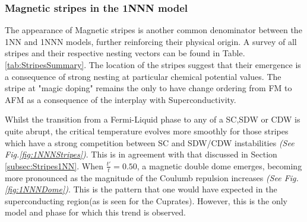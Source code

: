 \documentclass[12pt]{article}
\begin{document}
\newpage

\subsubsection{Magnetic stripes in the 1NNN model}
\label{subsec:Stripes1NNN}

The appearance of Magnetic stripes is another common denominator between the 1NN and 1NNN models, further reinforcing their physical origin.
A survey of all stripes and their respective nesting vectors can be found in Table.\ref{tab:StripesSummary}. The location of the
stripes suggest that their emergence is a consequence of strong nesting at particular chemical potential values. 
The stripe at "magic doping" remains the only to have change ordering from FM to AFM as a consequence of the interplay with Superconductivity. 



\medskip 

\noindent Whilst the transition from a Fermi-Liquid phase to any of a SC,SDW or CDW is quite abrupt, the critical temperature
evolves more smoothly for those stripes which have a strong competition between SC and SDW/CDW instabilities \textit{(See Fig.\ref{fig:1NNNStripes})}. This is in agreement with
that discussed in Section \ref{subsec:Stripes1NN}. When $\frac{t'}{t} = 0.50$, a magnetic double dome emerges, becoming more pronounced as the 
magnitude of the Coulumb repulsion increases \textit{(See Fig.\ref{fig:1NNNDome})}. This is the pattern that one would have expected in
the superconducting region(as is seen for the Cuprates\cite{taillefer2010scattering}). However, this is the only 
model and phase for which this trend is observed. 
 
\end{document}
